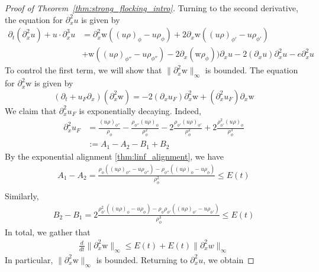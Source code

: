 \documentclass[11pt,letterpaper]{amsart}
\theoremstyle{plain}
\theoremstyle{definition}
\theoremstyle{remark}
\newcommand{\thm}[1]{Theorem~\ref{#1}}
\renewcommand{\leq}{\leqslant}
\def \wt {\mathrm{w}}
\begin{document}
\begin{proof}[Proof of \thm{thm:strong_flocking_intro}]
    Turning to the second derivative, the equation for $\partial^2_x u$ is given by 
    \begin{align*}
        \partial_t (\partial_x^2 u) + u \cdot \partial^3_x u
        &= \partial_x^2 \wt ( (u\rho)_{\phi} - u \rho_{\phi} )
            + 2 \partial_x \wt ( (u\rho)_{\phi'} - u \rho_{\phi'} )  \\
        &+ \wt ( (u\rho)_{\phi''} - u \rho_{\phi''} ) 
            - 2\partial_x(\wt\rho_{\phi})) \partial_x u
            - 2 (\partial_x u) \partial_x^2 u
            - e \partial^2_x u
    \end{align*}
    To control the first term, we will show that $\|\partial^2_x \wt\|_{\infty}$ is bounded. 
    The equation for $\partial^2_x \wt$ is given by 
    \begin{equation*}
        (\partial_t + u_F \partial_x)(\partial^2_x \wt) = - 2(\partial_x u_F) \partial^2_x \wt + (\partial_x^2 u_F) \partial_x \wt 
    \end{equation*}
    We claim that $\partial^2_x u_F$ is exponentially decaying.  Indeed, 
    \begin{align*}
        \partial^2_x u_F 
            &= \frac{(u \rho)_{\phi''}} {\rho_{\phi}} - \frac{\rho_{\phi''} (u\rho)_{\phi}} {\rho_{\phi}^2}
            - 2 \frac{\rho_{\phi'} (u\rho)_{\phi'}} {\rho_{\phi}^2} + 2\frac{\rho_{\phi'}^2 (u\rho)_{\phi}} {\rho_{\phi}^3} \\
            &:= A_1 - A_2 - B_1 + B_2
    \end{align*}
    By the exponential alignment \eqref{thm:linf_alignment}, we have 
    \begin{align*}
        A_1 - A_2 
            = \frac{ \rho_{\phi} ((u \rho)_{\phi''} - u \rho_{\phi''}) - \rho_{\phi''} ((u\rho)_{\phi} - u\rho_{\phi})} {\rho_{\phi}^2}
            \leq E(t) \\
    \end{align*}
    Similarly, 
    \begin{align*}
        B_2 - B_1
            = 2 \frac{\rho_{\phi'}^2 ((u\rho)_{\phi} - u\rho_{\phi}) - \rho_{\phi} \rho_{\phi'} ((u\rho)_{\phi'} - u\rho_{\phi'}) } {\rho_{\phi}^3}
            \leq E(t)
    \end{align*}
    In total, we gather that 
    \begin{align*}
        \frac{d}{dt} \| \partial^2_x \wt \|_{\infty} \leq E(t) + E(t) \|\partial^2_x w\|_{\infty}
    \end{align*}
    In particular, $\|\partial^2_x \wt\|_{\infty}$ is bounded.  Returning to $\partial_x^2 u$, we obtain 

\end{proof}
\end{document}
